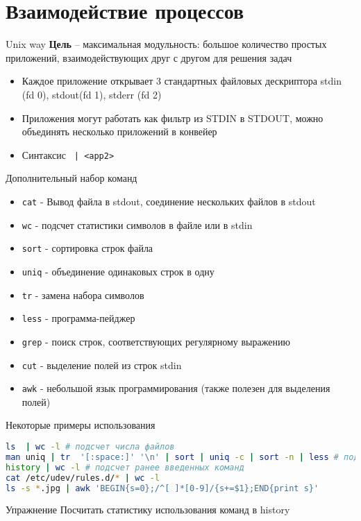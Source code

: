 \documentclass[ignorenonframetext, professionalfonts, hyperref={pdftex, unicode}]{beamer}
\begin{document}
\section{Взаимодействие процессов}
\begin{frame}{Unix way}
  \textbf{Цель} -- максимальная модульность: большое количество простых приложений, взаимодействующих друг с другом для решения задач
  \begin{itemize}
    \item Каждое приложение открывает 3 стандартных файловых дескриптора stdin (fd 0), stdout(fd 1), stderr (fd 2)
    \item Приложения могут работать как фильтр из STDIN в STDOUT, можно объединять несколько приложений в конвейер
    \item Синтаксис {\tt <app1> | <app2>}
  \end{itemize}
\end{frame}
\begin{frame}{Дополнительный набор команд}
 \begin{itemize}
  \item {\tt cat} - Вывод файла в stdout, соединение нескольких файлов в stdout
  \item {\tt wc} - подсчет статистики символов в файле или в stdin 
  \item {\tt sort} - сортировка строк файла
  \item {\tt uniq} - объединение одинаковых строк в одну
  \item {\tt tr} - замена набора символов
  \item {\tt less} - программа-пейджер
  \item {\tt grep} - поиск строк, соответствующих регулярному выражению
  \item {\tt cut} - выделение полей из строк stdin
  \item {\tt awk} - небольшой язык программирования (также полезен для выделения полей)
 \end{itemize}
\end{frame}
\begin{frame}[fragile]{Некоторые примеры использования}
\begin{lstlisting}[language=bash]
ls  | wc -l # подсчет числа файлов
man uniq | tr  '[:space:]' '\n' | sort | uniq -c | sort -n | less # подсчет количества слов в тексте man uniq
history | wc -l # подсчет ранее введенных команд
cat /etc/udev/rules.d/* | wc -l
ls -s *.jpg | awk 'BEGIN{s=0};/^[ ]*[0-9]/{s+=$1};END{print s}'
\end{lstlisting}
\pause
\begin{block}{Упражнение}
Посчитать статистику использования команд в history
\end{block}
\end{frame}
\end{document}

